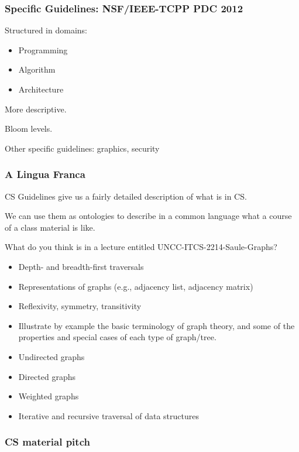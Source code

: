 \documentclass[aspectratio=169]{beamer}
\begin{document}
\begin{frame}
  \frametitle{Specific Guidelines: NSF/IEEE-TCPP PDC 2012}

  Structured in domains:
  \begin{itemize}
  \item Programming
  \item Algorithm
  \item Architecture
  \end{itemize}

  More descriptive.

  Bloom levels.

  Other specific guidelines: graphics, security  
\end{frame}


\begin{frame}
  \frametitle{A Lingua Franca}

  CS Guidelines give us a fairly detailed description of what is in CS.

  We can use them as ontologies to describe in a common language what
  a course of a class material is like.

  \begin{block}{What do you think is in a lecture entitled UNCC-ITCS-2214-Saule-Graphs?}
    \tiny
  \begin{itemize} 
    \item Depth- and breadth-first traversals
    \item Representations of graphs (e.g., adjacency list, adjacency matrix)
    \item Reflexivity, symmetry, transitivity
    \item Illustrate by example the basic terminology of graph theory, and some of the properties and special cases of each type of graph/tree.
    \item Undirected graphs
    \item Directed graphs
    \item Weighted graphs
    \item Iterative and recursive traversal of data structures
  \end{itemize}
  \end{block}
\end{frame}

\begin{frame}
  \frametitle{CS material pitch}
\end{frame}
\end{document}
